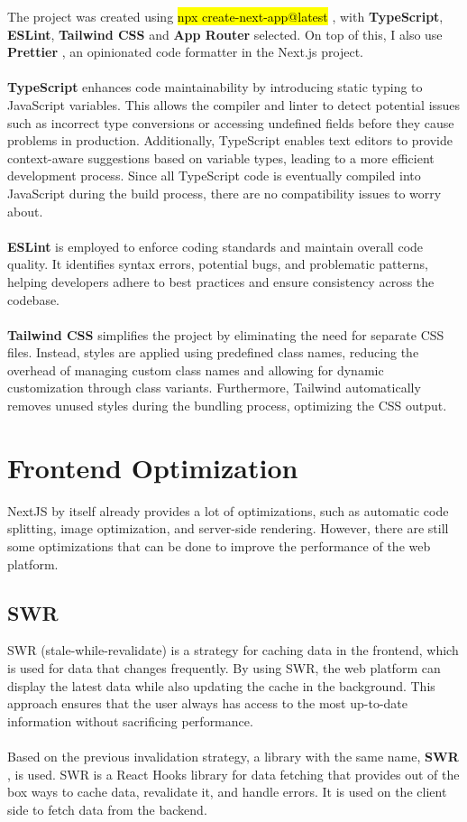 \noindent The project was created using \hl{npx create-next-app@latest} \cite{nextjs-installation}, with \textbf{TypeScript}, \textbf{ESLint}, \textbf{Tailwind CSS} and \textbf{App Router} selected. On top of this, I also use \textbf{Prettier} \cite{prettier}, an opinionated code formatter in the Next.js project.
\\\\
\noindent \textbf{TypeScript} enhances code maintainability by introducing static typing to JavaScript variables. This allows the compiler and linter to detect potential issues such as incorrect type conversions or accessing undefined fields before they cause problems in production. Additionally, TypeScript enables text editors to provide context-aware suggestions based on variable types, leading to a more efficient development process. Since all TypeScript code is eventually compiled into JavaScript during the build process, there are no compatibility issues to worry about.
\\\\
\noindent \textbf{ESLint} is employed to enforce coding standards and maintain overall code quality. It identifies syntax errors, potential bugs, and problematic patterns, helping developers adhere to best practices and ensure consistency across the codebase.
\\\\
\noindent \textbf{Tailwind CSS} simplifies the project by eliminating the need for separate CSS files. Instead, styles are applied using predefined class names, reducing the overhead of managing custom class names and allowing for dynamic customization through class variants. Furthermore, Tailwind automatically removes unused styles during the bundling process, optimizing the CSS output.

\section{Frontend Optimization}

NextJS by itself already provides a lot of optimizations, such as automatic code splitting, image optimization, and server-side rendering. However, there are still some optimizations that can be done to improve the performance of the web platform.

\subsection{SWR}

\noindent SWR (stale-while-revalidate) is a strategy for caching data in the frontend, which is used for data that changes frequently. By using SWR, the web platform can display the latest data while also updating the cache in the background. This approach ensures that the user always has access to the most up-to-date information without sacrificing performance.
\\\\
\noindent Based on the previous invalidation strategy, a library with the same name, \textbf{SWR} \cite{swr}, is used. SWR is a React Hooks library for data fetching that provides out of the box ways to cache data, revalidate it, and handle errors. It is used on the client side to fetch data from the backend.

